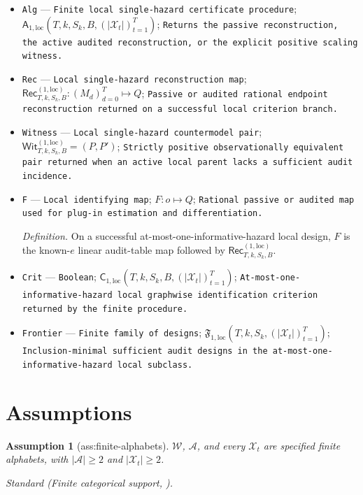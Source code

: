 \documentclass{article}
\newtheorem{assumption}{Assumption}
\begin{document}
\begin{itemize}
  \item \texttt{Alg} --- \texttt{Finite local single-\allowbreak{}hazard certificate procedure}; \(\mathsf A_{1,\mathrm{loc}}(T,k,S_k,B,(|\mathcal X_t|)_{t=1}^T)\); \texttt{Returns the passive reconstruction,\allowbreak{} the active audited reconstruction,\allowbreak{} or the explicit positive scaling witness.}
  \item \texttt{Rec} --- \texttt{Local single-\allowbreak{}hazard reconstruction map}; \(\mathsf{Rec}^{(1,\mathrm{loc})}_{T,k,S_k,B}:(M_d)_{d=0}^T\mapsto Q\); \texttt{Passive or audited rational endpoint reconstruction returned on a successful local criterion branch.}
  \item \texttt{Witness} --- \texttt{Local single-\allowbreak{}hazard countermodel pair}; \(\mathsf{Wit}^{(1,\mathrm{loc})}_{T,k,S_k,B}=(P,P')\); \texttt{Strictly positive observationally equivalent pair returned when an active local parent lacks a sufficient audit incidence.}
  \item \texttt{F} --- \texttt{Local identifying map}; \(F:o\mapsto Q\); \texttt{Rational passive or audited map used for plug-\allowbreak{}in estimation and differentiation.}
  \par\smallskip\noindent\emph{Definition.} On a successful at-most-one-informative-hazard local design, \(F\) is the known-\(e\) linear audit-table map followed by \(\mathsf{Rec}^{(1,\mathrm{loc})}_{T,k,S_k,B}\).
  \item \texttt{Crit} --- \texttt{Boolean}; \(\mathsf C_{1,\mathrm{loc}}(T,k,S_k,B,(|\mathcal X_t|)_{t=1}^T)\); \texttt{At-\allowbreak{}most-\allowbreak{}one-\allowbreak{}informative-\allowbreak{}hazard local graphwise identification criterion returned by the finite procedure.}
  \item \texttt{Frontier} --- \texttt{Finite family of designs}; \(\mathfrak F_{1,\mathrm{loc}}(T,k,S_k,(|\mathcal X_t|)_{t=1}^T)\); \texttt{Inclusion-\allowbreak{}minimal sufficient audit designs in the at-\allowbreak{}most-\allowbreak{}one-\allowbreak{}informative-\allowbreak{}hazard local subclass.}
\end{itemize}

\section{Assumptions}

\begin{assumption}[ass:finite-alphabets]\label{ass:finite-alphabets}
\(\mathcal W\), \(\mathcal A\), and every \(\mathcal X_t\) are specified finite alphabets, with \(|\mathcal A|\ge2\) and \(|\mathcal X_t|\ge2\).
\par\smallskip\noindent\emph{Standard} (Finite categorical support, \cite{TikkaKarvanen2024Categorical}).
\end{assumption}
\end{document}
